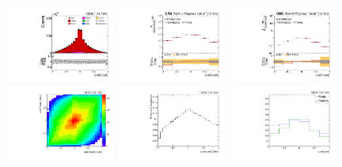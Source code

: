 \begin{refsection}
\begin{figure}[htb]
\begin{center}
 \includegraphics[width=0.32\textwidth]{fig_fullRun2UL/controlplots/combined/Hyp_LLBarCkk.pdf}
 \includegraphics[width=0.32\textwidth]{fig_fullRun2UL/unfolding/combined/UnfoldedResults_c_kk.pdf}
 \includegraphics[width=0.32\textwidth]{fig_fullRun2UL/unfolding/combined/UnfoldedResultsNorm_c_kk.pdf} \\
 \includegraphics[width=0.32\textwidth]{fig_fullRun2UL/unfolding/combined/ResponseMatrix_c_kk.pdf}
 \includegraphics[width=0.32\textwidth]{fig_fullRun2UL/unfolding/combined/TotEff_c_kk.pdf}
 \includegraphics[width=0.32\textwidth]{fig_fullRun2UL/unfolding/combined/PurStab_c_kk.pdf} \\

\end{center}
\end{figure}
\end{refsection}
